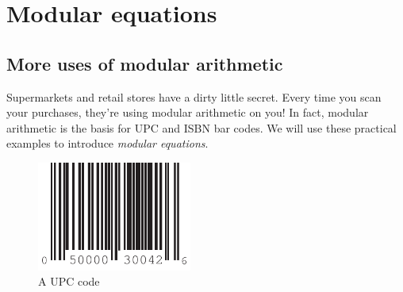 \section{Modular equations}\label{section:modular:ModularEquations}

\subsection{More uses of modular arithmetic  }
 
Supermarkets and retail stores have a dirty little secret. Every time you scan your purchases, they're using modular arithmetic on you! In fact, modular arithmetic is the basis for UPC and ISBN bar codes. We will use these practical examples to introduce \emph{modular equations}. 

\begin{figure}
\begin{center}
\centerline {
\includegraphics[width=2in]{images/UPCcode.pdf}
}
\end{center}
\caption{A UPC code}
\label{groups_figure_3}
\end{figure}


